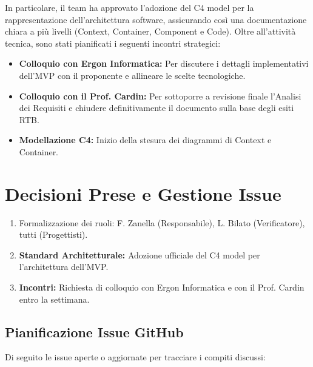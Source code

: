 \documentclass[a4paper, 11pt, oneside]{scrartcl} %
\begin{document}
In particolare, il team ha approvato l'adozione del C4 model per la rappresentazione dell'architettura software, assicurando così una documentazione chiara a più livelli (Context, Container, Component e Code).
Oltre all'attività tecnica, sono stati pianificati i seguenti incontri strategici:
\begin{itemize}
    \item \textbf{Colloquio con Ergon Informatica:} Per discutere i dettagli implementativi dell'MVP con il proponente e allineare le scelte tecnologiche.
    \item \textbf{Colloquio con il Prof. Cardin:} Per sottoporre a revisione finale l'Analisi dei Requisiti e chiudere definitivamente il documento sulla base degli esiti RTB.
    \item \textbf{Modellazione C4:} Inizio della stesura dei diagrammi di Context e Container.
\end{itemize}

\newpage
\section{Decisioni Prese e Gestione Issue}

\begin{enumerate}
    \item Formalizzazione dei ruoli: F. Zanella (Responsabile), L. Bilato (Verificatore), tutti (Progettisti).
    \item \textbf{Standard Architetturale:} Adozione ufficiale del C4 model per l'architettura dell'MVP.
    \item \textbf{Incontri:} Richiesta di colloquio con Ergon Informatica e con il Prof. Cardin entro la settimana.
\end{enumerate}

\subsection{Pianificazione Issue GitHub}
Di seguito le issue aperte o aggiornate per tracciare i compiti discussi:
\end{document}
